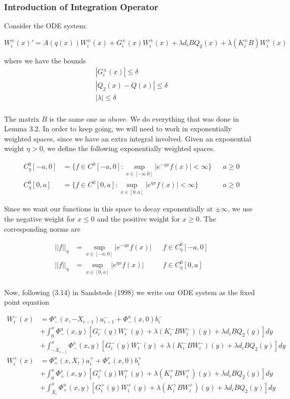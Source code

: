 \documentclass[12pt]{article}
\begin{document}
\subsubsection*{Introduction of Integration Operator}

Consider the ODE system:

\begin{equation}\label{ODE2}
W_i^\pm(x)' = A(q(x)) W_i^\pm(x) + G_i^\pm(x) W_i^\pm(x) + \lambda d_i B Q_2(x) + \lambda (K_i^\pm B )W_i^\pm(x)
\end{equation}

where we have the bounds
\begin{align*}
|G_i^\pm(x)| \leq \delta \\
|Q_2(x) - Q(x) | \leq \delta \\
|\lambda| \leq \delta \\
\end{align*}

The matrix $B$ is the same one as above. We do everything that was done in Lemma 3.2. In order to keep going, we will need to work in exponentially weighted spaces, since we have an extra integral involved. Given an exponential weight $\eta > 0$, we define the following exponentially weighted spaces.

\begin{align*}
C^0_\eta[-a, 0] &= \{ f \in C^0[-a, 0] : \sup_{x \in [-a, 0]} |e^{-\eta x} f(x) | < \infty \} && a \geq 0 \\
C^0_\eta[0, a] &= \{ f \in C^0[0, a] : \sup_{x \in [0, a]} |e^{\eta x} f(x) | < \infty \} && a \geq 0 
\end{align*}

Since we want our functions in this space to decay exponentially at $\pm \infty$, we use the negative weight for $x \leq 0$ and the positive weight for $x \geq 0$. The corresponding norms are 

\begin{align*}
|| f ||_\eta &= \sup_{x \in [-a, 0]} |e^{-\eta x} f(x) | && f \in C^0_\eta[-a, 0] \\
|| f ||_\eta &= \sup_{x \in [0, a]} |e^{\eta x} f(x) | && f \in C^0_\eta[0, a] \\
\end{align*}

Now, following (3.14) in Sandstede (1998) we write our ODE system as the fixed point equation

\begin{align*}
W_i^-(x) &= \Phi^s_-(x, -X_{i-1})a^-_{i-1} + \Phi^u_-(x, 0)b_i^- \\
&+ \int_0^x \Phi^u_-(x, y)[G_i^-(y) W_i^-(y) + \lambda (K_i^- B W_i^-)(y) + \lambda d_i B Q_2(y) ] dy \\
&+ \int_{-X_{i-1}}^x \Phi^s_-(x, y)[G_i^-(y) W_i^-(y) + \lambda (K_i^-B W_i^-)(y) + \lambda d_i B Q_2(y) ] dy \\
W_i^+(x) &= \Phi^u_+(x, X_i)a^+_{i} + \Phi^s_+(x, 0)b_i^+ \\
&+ \int_0^x \Phi^s_+(x, y)[G_i^+(y) W_i^+(y) + \lambda (K_i^+ B W_i^+)(y) + \lambda d_i B Q_2(y) ] dy \\
&+ \int_{X_{i}}^x \Phi^u_+(x, y)[G_i^+(y) W_i^+(y) + \lambda (K_i^+ B W_i^+)(y) + \lambda d_i B Q_2(y) ] dy
\end{align*}
\end{document}
